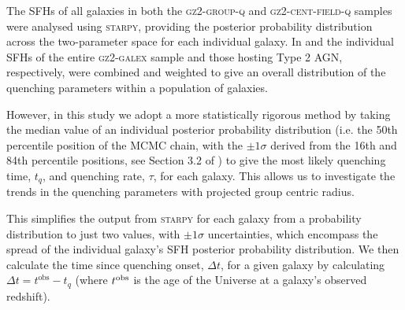 \documentclass[useAMS,usenatbib]{mn2e}
\begin{document}
The SFHs of all galaxies in both the \textsc{gz2-group-q} and \textsc{gz2-cent-field-q} samples were analysed using \textsc{starpy}, providing the posterior probability distribution across the two-parameter space for each individual galaxy. In \cite{smethurst15} and \cite{smethurst16} the individual SFHs of the entire \textsc{gz2-galex} sample and those hosting Type 2 AGN, respectively, were combined and weighted to give an overall distribution of the quenching parameters within a population of galaxies. 

However, in this study we adopt a more statistically rigorous method by taking the median value of an individual posterior probability distribution (i.e. the 50th percentile position of the MCMC chain, with the $\pm1\sigma$ derived from the 16th and 84th percentile positions, see Section 3.2 of \citealt{smethurst15}) to give the most likely quenching time, $t_{q}$, and quenching rate, $\tau$, for each galaxy. This allows us to investigate the trends in the quenching parameters with projected group centric radius. 

This simplifies the output from \textsc{starpy} for each galaxy from a probability distribution to just two values, with $\pm1\sigma$ uncertainties, which encompass the spread of the individual galaxy's SFH posterior probability distribution. We then calculate the time since quenching onset, $\Delta t$, for a given galaxy by calculating {\bf $\Delta t = t^\mathrm{obs} - t_{q}$} (where $t^{\rm{obs}}$ is the age of the Universe at a galaxy's observed redshift). 
\end{document}
